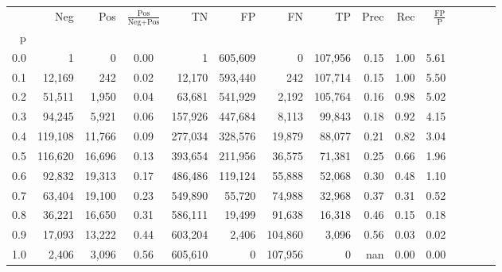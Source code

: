 \begin{tabular}{rrrcrrrrrrrrrrr}
\toprule
{} &      Neg &     Pos & $\frac{\text{Pos}}{\text{Neg}+\text{Pos}}$ &       TN &       FP &       FN &       TP &  Prec &   Rec & $\frac{\text{FP}}{\text{P}}$ \\
p   &          &         &                                            &          &          &          &          &       &       &                              \\
\midrule
0.0 &        1 &       0 &                                       0.00 &        1 &  605,609 &        0 &  107,956 &  0.15 &  1.00 &                         5.61 \\
0.1 &   12,169 &     242 &                                       0.02 &   12,170 &  593,440 &      242 &  107,714 &  0.15 &  1.00 &                         5.50 \\
0.2 &   51,511 &   1,950 &                                       0.04 &   63,681 &  541,929 &    2,192 &  105,764 &  0.16 &  0.98 &                         5.02 \\
0.3 &   94,245 &   5,921 &                                       0.06 &  157,926 &  447,684 &    8,113 &   99,843 &  0.18 &  0.92 &                         4.15 \\
0.4 &  119,108 &  11,766 &                                       0.09 &  277,034 &  328,576 &   19,879 &   88,077 &  0.21 &  0.82 &                         3.04 \\
0.5 &  116,620 &  16,696 &                                       0.13 &  393,654 &  211,956 &   36,575 &   71,381 &  0.25 &  0.66 &                         1.96 \\
0.6 &   92,832 &  19,313 &                                       0.17 &  486,486 &  119,124 &   55,888 &   52,068 &  0.30 &  0.48 &                         1.10 \\
0.7 &   63,404 &  19,100 &                                       0.23 &  549,890 &   55,720 &   74,988 &   32,968 &  0.37 &  0.31 &                         0.52 \\
0.8 &   36,221 &  16,650 &                                       0.31 &  586,111 &   19,499 &   91,638 &   16,318 &  0.46 &  0.15 &                         0.18 \\
0.9 &   17,093 &  13,222 &                                       0.44 &  603,204 &    2,406 &  104,860 &    3,096 &  0.56 &  0.03 &                         0.02 \\
1.0 &    2,406 &   3,096 &                                       0.56 &  605,610 &        0 &  107,956 &        0 &   nan &  0.00 &                         0.00 \\
\bottomrule
\end{tabular}
